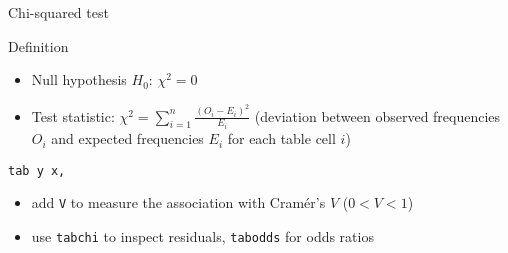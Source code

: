 \documentclass[t]{beamer}
\begin{document}
  \begin{frame}{Chi-squared test}
    
    
    \begin{block}{Definition}
    
      \begin{itemize}
        \item Null hypothesis $H_0$:
        $\chi^2=0$
      
        \item Test statistic:
        $\chi^2=\sum_{i=1}^{n} \frac{(O_i - E_i)^2}{E_i}$ (deviation between observed frequencies $O_i$ and expected frequencies $E_i$ for each table cell $i$)
        
      \end{itemize}

    \end{block}
    
    \begin{block}{\texttt{tab y x, }}

      \begin{itemize}
        \item add \texttt{V} to measure the association with Cramér's $V$ ($0 < V < 1$)
        \item use \texttt{tabchi} to inspect residuals, \texttt{tabodds} for odds ratios
      \end{itemize}

    \end{block}
    
  \end{frame}
  
  
\end{document}
